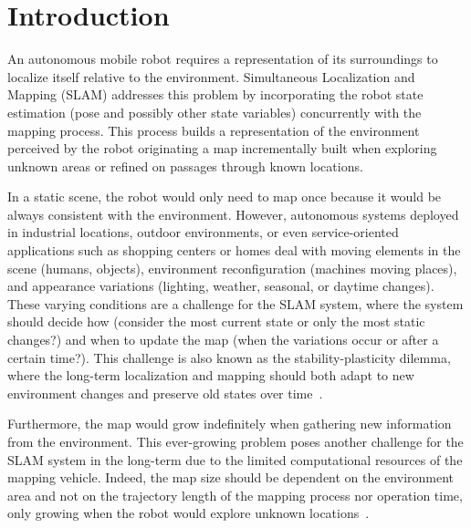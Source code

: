 \section{Introduction}
\label{sec:intro}

An autonomous mobile robot requires a representation of its surroundings to localize itself relative to the environment.
Simultaneous Localization and Mapping (SLAM) addresses this problem by incorporating the robot state estimation (pose and possibly other state variables) concurrently with the mapping process. This process builds a representation of the environment perceived by the robot originating a map incrementally built when exploring unknown areas or refined on passages through known locations.

In a static scene, the robot would only need to map once because it would be always consistent with the environment.
However, autonomous systems deployed in industrial locations, outdoor environments, or even service-oriented applications such as shopping centers or homes deal with moving elements in the scene (humans, objects), environment reconfiguration (machines moving places), and appearance variations (lighting, weather, seasonal, or daytime changes).
These varying conditions are a challenge for the SLAM system, where the system should decide how (consider the most current state or only the most static changes?) and when to update the map (when the variations occur or after a certain time?).
This challenge is also known as the stability-plasticity dilemma, where the long-term localization and mapping should both adapt to new environment changes and preserve old states over time~\parencite{biber-duckett:2009:0278364908096286}.

Furthermore, the map would grow indefinitely when gathering new information from the environment. This ever-growing problem poses another challenge for the SLAM system in the long-term due to the limited computational resources of the mapping vehicle. Indeed, the map size should be dependent on the environment area and not on the trajectory length of the mapping process nor operation time, only growing when the robot would explore unknown locations~\parencite{kretzschmar-stachniss:2012:0278364912455072}.

